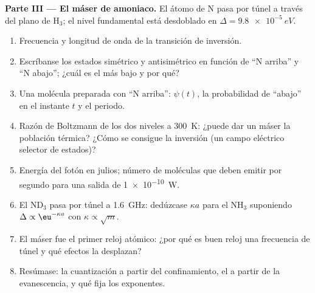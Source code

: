\begin{problem}
\textbf{Parte III --- El máser de amoniaco.}
El átomo de N pasa por túnel a través del plano de H$_3$; el nivel fundamental está desdoblado
en $\Delta = \qty{9.8e-5}{eV}$.
\begin{enumerate}[resume]
  \item Frecuencia y longitud de onda de la transición de inversión.
  \item Escríbanse los estados simétrico y antisimétrico en función de
        ``N arriba'' y ``N abajo''; ¿cuál es el más bajo y por qué?
  \item Una molécula preparada con ``N arriba'': $\psi(t)$, la probabilidad de
        ``abajo'' en el instante $t$ y el periodo.
  \item Razón de Boltzmann de los dos niveles a \qty{300}{K}: ¿puede dar un máser
        la población térmica? ¿Cómo se consigue la inversión
        (un campo eléctrico selector de estados)?
  \item Energía del fotón en julios; número de moléculas que deben emitir
        por segundo para una salida de \qty{1e-10}{W}.
  \item El ND$_3$ pasa por túnel a \qty{1.6}{GHz}: dedúzcase $\kappa a$ para el NH$_3$
        suponiendo $\Delta \propto \eu^{-\kappa a}$ con $\kappa \propto \sqrt{m}$.
  \item El máser fue el primer reloj atómico: ¿por qué es buen reloj una
        frecuencia de túnel y qué efectos la desplazan?
  \item Resúmase: la cuantización a partir del confinamiento, el  a partir de la
        evanescencia, y qué fija los exponentes.
\end{enumerate}
\end{problem}
